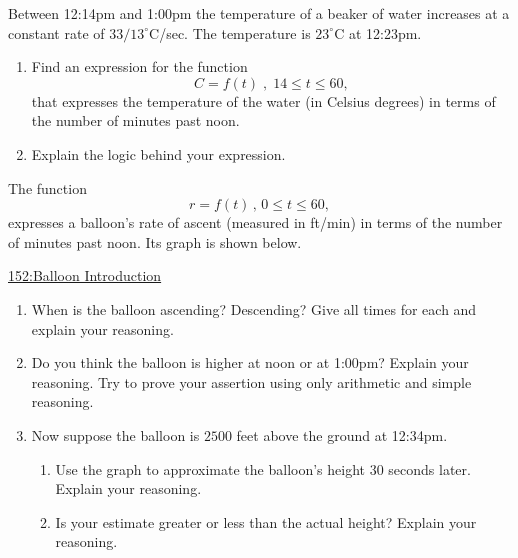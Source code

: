 \documentclass{ximera}
\begin{document}
\begin{example}  \label{Ex:IUDFr3f3fgl}
Between 12:14pm and 1:00pm the temperature of a beaker of water increases at a constant rate of $33/13^\circ$C/sec. The temperature is $23^\circ$C at 12:23pm.

\begin{enumerate}
\item Find an expression for the function 
\[
       C=f(t)\; , \; 14\leq t \leq 60, 
\]
that expresses the temperature of the water (in Celsius degrees) in terms of the number of minutes past noon.

\item Explain the logic behind your expression.

\end{enumerate}
\end{example}



\begin{example}  \label{Ex:98dfrghha}

The function 
\[
    r = f(t) \, , \, 0\leq t \leq  60 , 
\]
expresses a balloon's rate of ascent (measured in ft/min) in terms of the number of minutes past noon. Its graph is shown below.

\begin{onlineOnly}
    \begin{center}
\end{center}
\end{onlineOnly}

\href{https://www.desmos.com/calculator/tgi5yiuzab}{152:Balloon Introduction}

\begin{enumerate}

\item When is the balloon ascending? Descending? Give all times for each and explain your reasoning.

\item Do you think the balloon is higher at noon or at 1:00pm? Explain your reasoning. Try to prove your assertion using only arithmetic and simple reasoning.

\item Now suppose the balloon is $2500$ feet above the ground at 12:34pm. 

\begin{enumerate}

\item Use the graph to approximate the balloon's height $30$ seconds later. Explain your reasoning.

\item Is your estimate greater or less than the actual height? Explain your reasoning.

\end{enumerate}
\end{enumerate}
\end{example}
\end{document}
